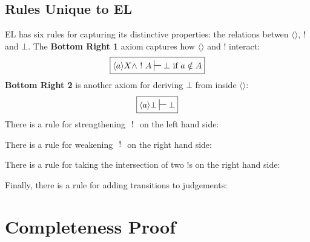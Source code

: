 \subsection{Rules Unique to EL}
EL has six rules for capturing its distinctive properties: the relations betwen $\langle \rangle$, $!$ and $\bot$.
The {\bf Bottom Right 1} axiom captures how $\langle \rangle$ and $!$ interact:
\[
\boxed
{
\langle a \rangle X \land \fBang A \judge \bot \mbox{ if } a \notin A
}
\]
{\bf Bottom Right 2} is another axiom for deriving $\bot$ from inside $\langle \rangle$:
\[
\boxed
{
\langle a \rangle \bot \judge \bot
}
\]
There is a rule for strengthening $\ ! \ $ on the left hand side: 
\begin{center}
\end{center}
There is a rule for weakening $\ ! \ $ on the right hand side: 
\begin{center}
\end{center}
There is a rule for taking the intersection of two $!$s on the right hand side:
\begin{center}
\end{center}
Finally, there is a rule for adding transitions to judgements:
\begin{center}
\end{center}

\section{Completeness Proof}

